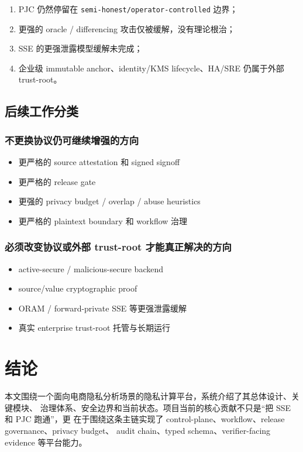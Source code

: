 \documentclass[UTF8,a4paper,12pt,oneside]{ctexrep}
\begin{document}
\begin{enumerate}
  \item PJC 仍然停留在 \texttt{semi-honest/operator-controlled} 边界；
  \item 更强的 oracle / differencing 攻击仅被缓解，没有理论根治；
  \item SSE 的更强泄露模型缓解未完成；
  \item 企业级 immutable anchor、identity/KMS lifecycle、HA/SRE 仍属于外部 trust-root。
\end{enumerate}

\section{后续工作分类}

\subsection{不更换协议仍可继续增强的方向}

\begin{itemize}
  \item 更严格的 source attestation 和 signed signoff
  \item 更严格的 release gate
  \item 更强的 privacy budget / overlap / abuse heuristics
  \item 更严格的 plaintext boundary 和 workflow 治理
\end{itemize}

\subsection{必须改变协议或外部 trust-root 才能真正解决的方向}

\begin{itemize}
  \item active-secure / malicious-secure backend
  \item source/value cryptographic proof
  \item ORAM / forward-private SSE 等更强泄露缓解
  \item 真实 enterprise trust-root 托管与长期运行
\end{itemize}

\chapter{结论}

本文围绕一个面向电商隐私分析场景的隐私计算平台，系统介绍了其总体设计、关键模块、
治理体系、安全边界和当前状态。项目当前的核心贡献不只是“把 SSE 和 PJC 跑通”，更
在于围绕这条主链实现了 control-plane、workflow、release governance、privacy budget、
audit chain、typed schema、verifier-facing evidence 等平台能力。
\end{document}
